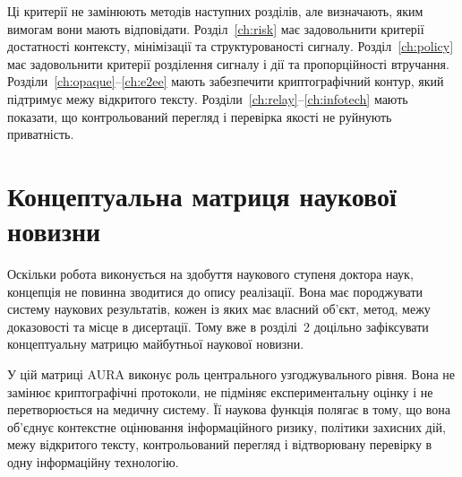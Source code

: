 Ці критерії не замінюють методів наступних розділів, але визначають, яким вимогам вони мають відповідати. Розділ~\ref{ch:risk} має задовольнити критерії достатності контексту, мінімізації та структурованості сигналу. Розділ~\ref{ch:policy} має задовольнити критерії розділення сигналу і дії та пропорційності втручання. Розділи~\ref{ch:opaque}--\ref{ch:e2ee} мають забезпечити криптографічний контур, який підтримує межу відкритого тексту. Розділи~\ref{ch:relay}--\ref{ch:infotech} мають показати, що контрольований перегляд і перевірка якості не руйнують приватність.

\section{Концептуальна матриця наукової новизни}
\label{sec:concept-novelty}

Оскільки робота виконується на здобуття наукового ступеня доктора наук, концепція не повинна зводитися до опису реалізації. Вона має породжувати систему наукових результатів, кожен із яких має власний об'єкт, метод, межу доказовості та місце в дисертації. Тому вже в розділі~2 доцільно зафіксувати концептуальну матрицю майбутньої наукової новизни.

У цій матриці AURA виконує роль центрального узгоджувального рівня. Вона не замінює криптографічні протоколи, не підміняє експериментальну оцінку і не перетворюється на медичну систему. Її наукова функція полягає в тому, що вона об'єднує контекстне оцінювання інформаційного ризику, політики захисних дій, межу відкритого тексту, контрольований перегляд і відтворювану перевірку в одну інформаційну технологію.

